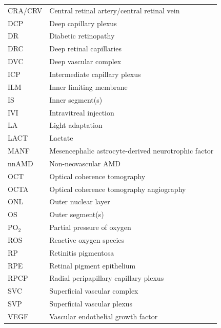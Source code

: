\documentclass{article}
\begin{document}
\begin{xltabular}{\textwidth}{ll}
  CRA/CRV       & Central retinal   artery/central retinal vein             \\
  DCP           & Deep capillary plexus                                     \\
  DR            & Diabetic retinopathy                                      \\
  DRC           & Deep retinal   capillaries                                \\
  DVC           & Deep vascular complex                                     \\
  ICP           & Intermediate   capillary plexus                           \\
  ILM           & Inner limiting   membrane                                 \\
  IS            & Inner segment(s)                                          \\
  IVI           & Intravitreal   injection                                  \\
  LA            & Light adaptation                                          \\
  LACT          & Lactate                                                   \\
  MANF          & Mesencephalic   astrocyte-derived neurotrophic factor     \\
  nnAMD         & Non-neovascular AMD                                       \\
  OCT           & Optical coherence   tomography                            \\
  OCTA           & Optical coherence tomography angiography                 \\
  ONL           & Outer nuclear layer                                       \\
  OS            & Outer segment(s)                                          \\
  PO$_2$        & Partial pressure of   oxygen                              \\
  ROS           & Reactive oxygen   species                                 \\
  RP            & Retinitis   pigmentosa                                    \\
  RPE           & Retinal pigment   epithelium                              \\
  RPCP          & Radial peripapillary   capillary plexus                   \\
  SVC           & Superficial vascular   complex                            \\
  SVP           & Superficial vascular   plexus                             \\
  VEGF          & Vascular endothelial   growth factor        \\
    \hline
\end{xltabular}
\end{document}
